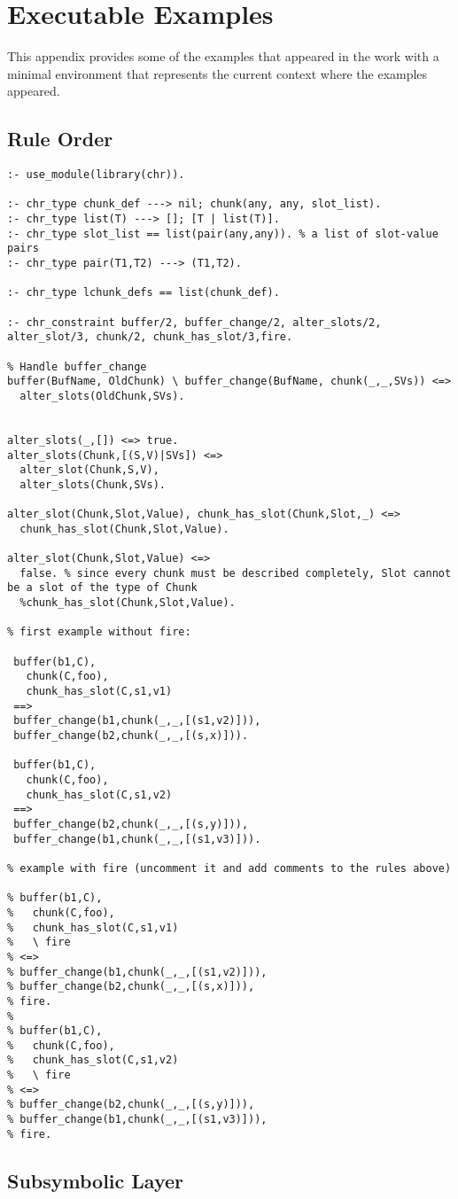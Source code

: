 \chapter{Executable Examples}

This appendix provides some of the examples that appeared in the work with a minimal environment that represents the current context where the examples appeared.

\section{Rule Order}
\label{app:ex:rule_order}

\begin{lstlisting}
:- use_module(library(chr)).

:- chr_type chunk_def ---> nil; chunk(any, any, slot_list).
:- chr_type list(T) ---> []; [T | list(T)].
:- chr_type slot_list == list(pair(any,any)). % a list of slot-value pairs
:- chr_type pair(T1,T2) ---> (T1,T2).

:- chr_type lchunk_defs == list(chunk_def).

:- chr_constraint buffer/2, buffer_change/2, alter_slots/2, alter_slot/3, chunk/2, chunk_has_slot/3,fire.

% Handle buffer_change
buffer(BufName, OldChunk) \ buffer_change(BufName, chunk(_,_,SVs)) <=>
  alter_slots(OldChunk,SVs).

  
alter_slots(_,[]) <=> true.
alter_slots(Chunk,[(S,V)|SVs]) <=> 
  alter_slot(Chunk,S,V),
  alter_slots(Chunk,SVs).
  
alter_slot(Chunk,Slot,Value), chunk_has_slot(Chunk,Slot,_) <=>
  chunk_has_slot(Chunk,Slot,Value).
  
alter_slot(Chunk,Slot,Value) <=>
  false. % since every chunk must be described completely, Slot cannot be a slot of the type of Chunk
  %chunk_has_slot(Chunk,Slot,Value).  

% first example without fire: 
  
 buffer(b1,C),
   chunk(C,foo),
   chunk_has_slot(C,s1,v1)
 ==>
 buffer_change(b1,chunk(_,_,[(s1,v2)])),
 buffer_change(b2,chunk(_,_,[(s,x)])).
 
 buffer(b1,C),
   chunk(C,foo),
   chunk_has_slot(C,s1,v2)
 ==>
 buffer_change(b2,chunk(_,_,[(s,y)])),
 buffer_change(b1,chunk(_,_,[(s1,v3)])).

% example with fire (uncomment it and add comments to the rules above) 
 
% buffer(b1,C),
%   chunk(C,foo),
%   chunk_has_slot(C,s1,v1)
%   \ fire
% <=>
% buffer_change(b1,chunk(_,_,[(s1,v2)])),
% buffer_change(b2,chunk(_,_,[(s,x)])),
% fire.
% 
% buffer(b1,C),
%   chunk(C,foo),
%   chunk_has_slot(C,s1,v2)
%   \ fire
% <=>
% buffer_change(b2,chunk(_,_,[(s,y)])),
% buffer_change(b1,chunk(_,_,[(s1,v3)])),
% fire.
\end{lstlisting}

\section{Subsymbolic Layer}
\label{app:ex:subsymbolic_layer}

